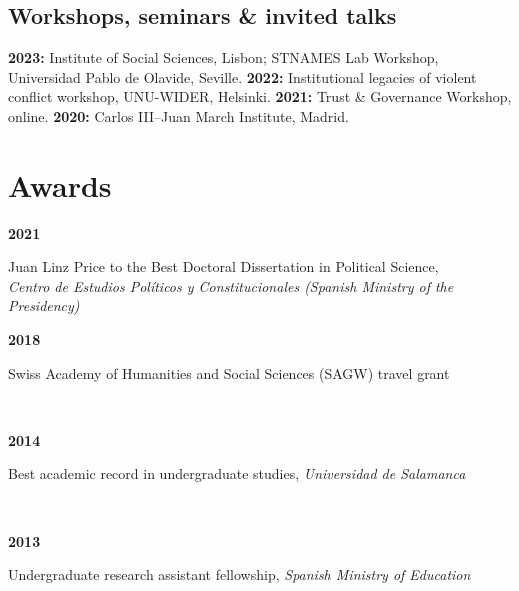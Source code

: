 \documentclass[a4paper, 12pt]{article}
\begin{document}
\subsection*{Workshops, seminars \& invited talks}

\textbf{2023:} Institute of Social Sciences, Lisbon; STNAMES Lab Workshop, Universidad Pablo de Olavide, Seville. \textbf{2022:} Institutional legacies of violent conflict workshop, UNU-WIDER, Helsinki. \textbf{2021:} Trust \& Governance Workshop, online. \textbf{2020:} Carlos III--Juan March Institute, Madrid.

\section*{Awards}


\begin{minipage}[t]{0.1\textwidth}
\textbf{2021}
\end{minipage}\hfill\begin{minipage}[t]{0.9\textwidth}
Juan Linz Price to the Best Doctoral Dissertation in Political Science,\\\textit{Centro de Estudios Políticos y Constitucionales (Spanish Ministry of the Presidency)}\\\vspace{-8pt}
\end{minipage}
\begin{minipage}[t]{0.1\textwidth}
\textbf{2018}
\end{minipage}\hfill\begin{minipage}[t]{0.9\textwidth}
Swiss Academy of Humanities and Social Sciences (SAGW) travel grant
\end{minipage}\\
\begin{minipage}[t]{0.1\textwidth}
\textbf{2014}
\end{minipage}\hfill\begin{minipage}[t]{0.9\textwidth}
Best academic record in undergraduate studies, {\it Universidad de Salamanca}
\end{minipage}\\
\begin{minipage}[t]{0.1\textwidth}
\textbf{2013}
\end{minipage}\hfill\begin{minipage}[t]{0.9\textwidth}
Undergraduate research assistant fellowship, {\it Spanish Ministry of Education}
\end{minipage}\\
\end{document}
